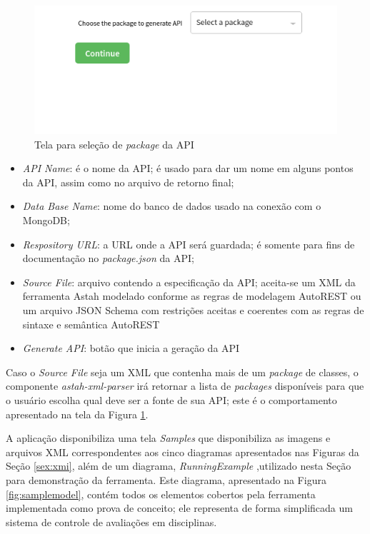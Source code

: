 \begin{figure}
    \begin{center}
        \includegraphics[scale=0.7]{imagens/Mockup_pack_select.png}
    \end{center}
	\caption{\label{fig:mpacks}Tela para seleção de \textit{package} da API}
\end{figure}

\begin{itemize}
    \item \textit{API Name}: é o nome da API; é usado para dar um nome em alguns pontos da API, assim como no arquivo de retorno final;
    \item \textit{Data Base Name}: nome do banco de dados usado na conexão com o MongoDB;
    \item \textit{Respository URL}: a URL onde a API será guardada; é somente para fins de documentação no \textit{package.json} da API;
    \item \textit{Source File}: arquivo contendo a especificação da API; aceita-se um XML da ferramenta Astah modelado conforme as regras de modelagem AutoREST ou um arquivo JSON Schema com restrições aceitas e coerentes com as regras de sintaxe e semântica AutoREST
    \item \textit{Generate API}: botão que inicia a geração da API
\end{itemize}

Caso o \textit{Source File} seja um XML que contenha mais de um \textit{package} de classes, o componente \textit{astah-xml-parser} irá retornar a lista de \textit{packages} disponíveis para que o usuário escolha qual deve ser a fonte de sua API; este é o comportamento apresentado na tela da Figura \ref{fig:mpacks}.

A aplicação disponibiliza uma tela \textit{Samples} que disponibiliza as imagens e arquivos XML correspondentes aos cinco diagramas apresentados nas Figuras da Seção \ref{sex:xmi}, além de um diagrama, \textit{RunningExample} ,utilizado nesta Seção para demonstração da ferramenta. Este diagrama, apresentado na Figura \ref{fig:samplemodel}, contém todos os elementos cobertos pela ferramenta implementada como prova de conceito; ele representa de forma simplificada um sistema de controle de avaliações em disciplinas.

